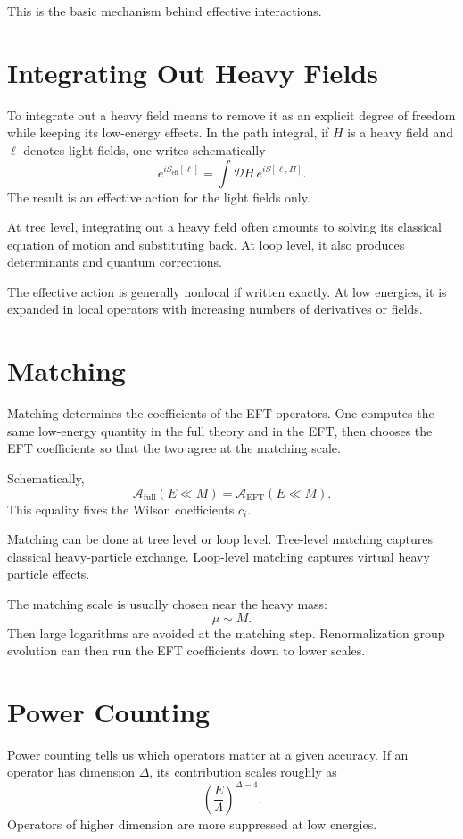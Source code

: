 This is the basic mechanism behind effective interactions.

\section{Integrating Out Heavy Fields}

To integrate out a heavy field means to remove it as an explicit degree of
freedom while keeping its low-energy effects. In the path integral, if \(H\) is a
heavy field and \(\ell\) denotes light fields, one writes schematically
\[
    e^{iS_{\mathrm{eff}}[\ell]}
    = \int\mathcal{D}H\,e^{iS[\ell,H]}.
\]
The result is an effective action for the light fields only.

At tree level, integrating out a heavy field often amounts to solving its
classical equation of motion and substituting back. At loop level, it also
produces determinants and quantum corrections.

The effective action is generally nonlocal if written exactly. At low energies,
it is expanded in local operators with increasing numbers of derivatives or
fields.

\section{Matching}

Matching determines the coefficients of the EFT operators. One computes the same
low-energy quantity in the full theory and in the EFT, then chooses the EFT
coefficients so that the two agree at the matching scale.

Schematically,
\[
    \mathcal{A}_{\mathrm{full}}(E\ll M)
    = \mathcal{A}_{\mathrm{EFT}}(E\ll M).
\]
This equality fixes the Wilson coefficients \(c_i\).

Matching can be done at tree level or loop level. Tree-level matching captures
classical heavy-particle exchange. Loop-level matching captures virtual heavy
particle effects.

The matching scale is usually chosen near the heavy mass:
\[
    \mu\sim M.
\]
Then large logarithms are avoided at the matching step. Renormalization group
evolution can then run the EFT coefficients down to lower scales.

\section{Power Counting}

Power counting tells us which operators matter at a given accuracy. If an
operator has dimension \(\Delta\), its contribution scales roughly as
\[
    \left(\frac{E}{\Lambda}\right)^{\Delta-4}.
\]
Operators of higher dimension are more suppressed at low energies.

